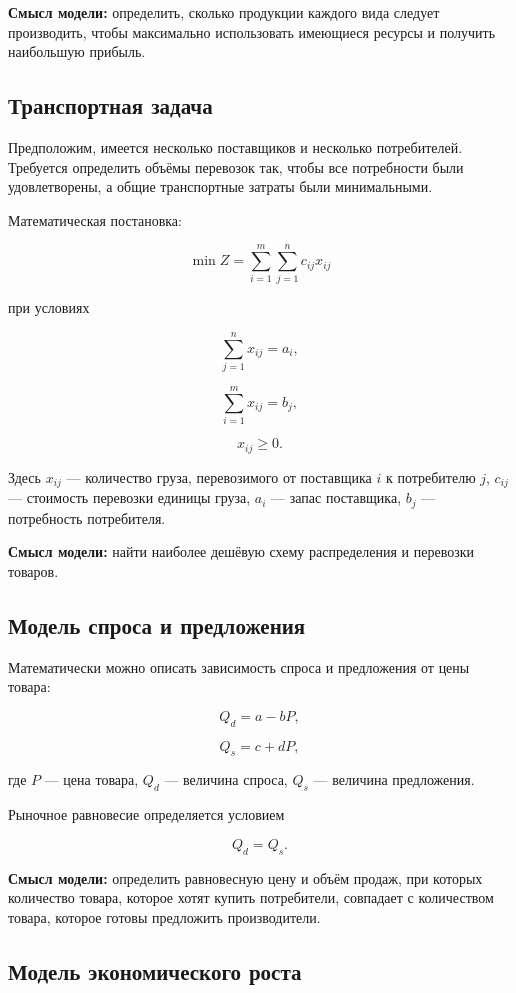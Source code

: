 \textbf{Смысл модели:} определить, сколько продукции каждого вида следует 
производить, чтобы максимально использовать имеющиеся ресурсы и получить 
наибольшую прибыль.

\subsection{Транспортная задача}

Предположим, имеется несколько поставщиков и несколько потребителей. 
Требуется определить объёмы перевозок так, чтобы все потребности были 
удовлетворены, а общие транспортные затраты были минимальными.

Математическая постановка:

\[
\min Z =
\sum_{i=1}^{m}\sum_{j=1}^{n} c_{ij}x_{ij}
\]

при условиях

\[
\sum_{j=1}^{n}x_{ij}=a_i,
\]

\[
\sum_{i=1}^{m}x_{ij}=b_j,
\]

\[
x_{ij}\geq0.
\]

Здесь $x_{ij}$ --- количество груза, перевозимого от поставщика $i$ 
к потребителю $j$, $c_{ij}$ --- стоимость перевозки единицы груза, 
$a_i$ --- запас поставщика, $b_j$ --- потребность потребителя.

\textbf{Смысл модели:} найти наиболее дешёвую схему распределения 
и перевозки товаров.

\subsection{Модель спроса и предложения}

Математически можно описать зависимость спроса и предложения от цены товара:

\[
Q_d=a-bP,
\]

\[
Q_s=c+dP,
\]

где $P$ --- цена товара, $Q_d$ --- величина спроса, 
$Q_s$ --- величина предложения.

Рыночное равновесие определяется условием

\[
Q_d=Q_s.
\]

\textbf{Смысл модели:} определить равновесную цену и объём продаж, 
при которых количество товара, которое хотят купить потребители, 
совпадает с количеством товара, которое готовы предложить производители.

\subsection{Модель экономического роста}

